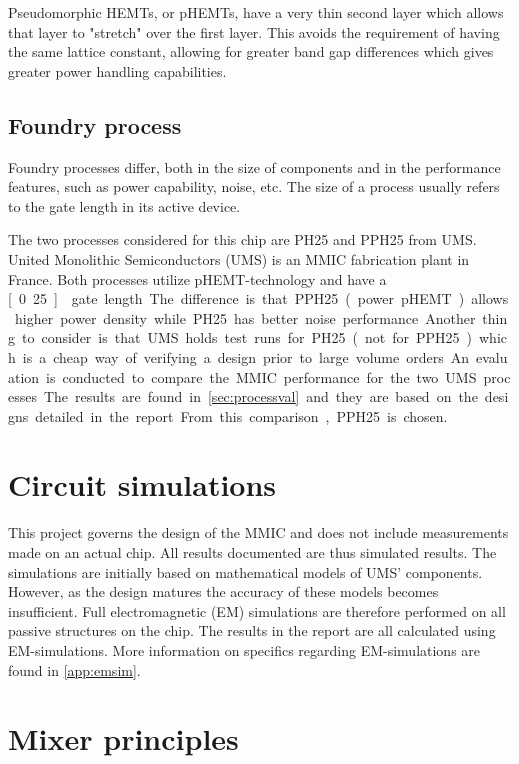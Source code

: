 			Pseudomorphic HEMTs, or pHEMTs, have a very thin second layer which allows that layer to "stretch" over the first layer. This avoids the requirement of having the same lattice constant, allowing for greater band gap differences which gives greater power handling capabilities.

		\subsection{Foundry process}
			Foundry processes differ, both in the size of components and in the performance features, such as power capability, noise, etc. The size of a process usually refers to the gate length in its active device.

			The two processes considered for this chip are PH25 and PPH25 from UMS. United Monolithic Semiconductors (UMS) is an MMIC fabrication plant in France. Both processes utilize pHEMT-technology and have a \unit[0.25]{\mum} gate length. The difference is that PPH25 (power pHEMT) allows higher power density while PH25 has better noise performance. Another thing to consider is that UMS holds test runs for PH25 (not for PPH25) which is a cheap way of verifying a design prior to large volume orders.

			An evaluation is conducted to compare the MMIC performance for the two UMS processes. The results are found in \autoref{sec:processval} and they are based on the designs detailed in the report. From this comparison, PPH25 is chosen.

	\section{Circuit simulations}
		This project governs the design of the MMIC and does not include measurements made on an actual chip. All results documented are thus simulated results. The simulations are initially based on mathematical models of UMS' components. However, as the design matures the accuracy of these models becomes insufficient. Full electromagnetic (EM) simulations are therefore performed on all passive structures on the chip. The results in the report are all calculated using EM-simulations. More information on specifics regarding EM-simulations are found in \autoref{app:emsim}.

	\section{Mixer principles}\label{ch:introduction_mixer}

